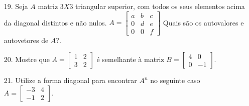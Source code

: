 \begin{itemize}
	\item [19.] Seja $A$ matriz $3X3$ triangular superior, com todos os seus elementos acima da diagonal distintos e não nulos.
	$A=\begin{bmatrix}
	a    & b & c \\
	0    & d &e \\
	0    & 0 & f
	\end{bmatrix}$ Quais são os autovalores e autovetores de $A$?.
\end{itemize}
\begin{itemize}
	\item [20.] Mostre que $A=\begin{bmatrix}
	1    & 2 \\
	3    & 2
	\end{bmatrix}$ é semelhante à matriz $B=\begin{bmatrix}
	4    & 0 \\
	0    & -1
	\end{bmatrix}$.
\end{itemize}
\begin{itemize}
	\item [21.] Utilize a forma diagonal para encontrar $A^{n}$ no seguinte caso  $A=\begin{bmatrix}
	-3    & 4 \\
	-1    & 2
	\end{bmatrix}$.
\end{itemize}

